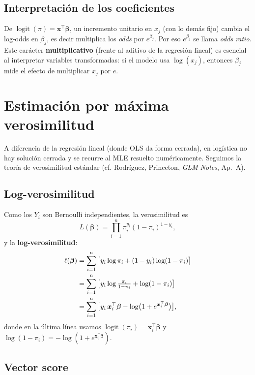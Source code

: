 \documentclass[11pt]{article}
\theoremstyle{plain}
\theoremstyle{definition}
\theoremstyle{remark}
\newcommand{\logit}{\operatorname{logit}}
\newcommand{\bbeta}{\bm{\beta}}
\newcommand{\bx}{\bm{x}}
\begin{document}
\subsection{Interpretación de los coeficientes}

De $\logit(\pi) = \bx^\top\bbeta$, un incremento unitario en $x_j$ (con lo demás
fijo) cambia el log-odds en $\beta_j$, es decir multiplica los \emph{odds} por
$e^{\beta_j}$. Por eso $e^{\beta_j}$ se llama \emph{odds ratio}. Este carácter
\textbf{multiplicativo} (frente al aditivo de la regresión lineal) es esencial
al interpretar variables transformadas: si el modelo usa $\log(x_j)$, entonces
$\beta_j$ mide el efecto de multiplicar $x_j$ por $e$.

\section{Estimación por máxima verosimilitud}\label{sec:mle}

A diferencia de la regresión lineal (donde OLS da forma cerrada), en logística
no hay solución cerrada y se recurre al MLE resuelto numéricamente. Seguimos la
teoría de verosimilitud estándar (cf. Rodríguez, Princeton, \emph{GLM Notes},
Ap.~A).

\subsection{Log-verosimilitud}

Como los $Y_i$ son Bernoulli independientes, la verosimilitud es
\[
  L(\bbeta) = \prod_{i=1}^n \pi_i^{y_i}(1-\pi_i)^{1-y_i},
\]
y la \textbf{log-verosimilitud}:
\begin{align}
  \ell(\bbeta)
  &= \sum_{i=1}^n \big[ y_i \log \pi_i + (1-y_i)\log(1-\pi_i) \big] \notag\\
  &= \sum_{i=1}^n \big[ y_i \log\tfrac{\pi_i}{1-\pi_i} + \log(1-\pi_i)\big]
     \notag\\
  &= \sum_{i=1}^n \big[ y_i\, \bx_i^\top\bbeta
     - \log\!\big(1 + e^{\bx_i^\top\bbeta}\big) \big],
  \label{eq:loglik}
\end{align}
donde en la última línea usamos $\logit(\pi_i)=\bx_i^\top\bbeta$ y
$\log(1-\pi_i) = -\log(1+e^{\bx_i^\top\bbeta})$.

\subsection{Vector score}
\end{document}
